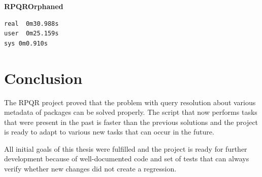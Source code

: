 \textbf{RPQROrphaned}

\begin{lstlisting}
real  0m30.988s
user  0m25.159s
sys 0m0.910s
\end{lstlisting}

\chapter{Conclusion}

The RPQR project proved that the problem with query resolution about various metadata of packages can
be solved properly. The script that now performs tasks that were present in the past is faster than the
previous solutions and the project is ready to adapt to various new tasks that can occur in the future.

All initial goals of this thesis were fulfilled and the project is ready for further development because
of well-documented code and set of tests that can always verify whether new changes did not create a
regression.
